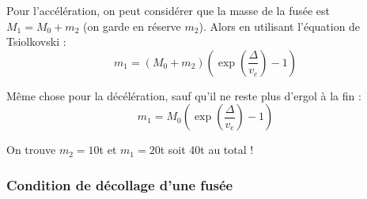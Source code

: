 \documentclass{report}
\begin{document}
\begin{itemize}
Pour l'accélération, on peut considérer que la masse de la fusée est $M_1=M_0+m_2$ (on garde en réserve $m_2$). Alors en utilisant l'équation de Tsiolkovski :
\begin{equation}
	m_1=(M_0+m_2)\left(\exp\left(\frac{\Delta}{v_e} \right) -1 \right) 
\end{equation}

Même chose pour la décélération, sauf qu'il ne reste plus d'ergol à la fin :
\begin{equation}
	m_1=M_0\left(\exp\left(\frac{\Delta}{v_e} \right) -1 \right) 
\end{equation}

On trouve $m_2=10$t et $m_1=20$t soit 40t au total !
\end{itemize}

\subsubsection*{Condition de décollage d'une fusée}
\end{document}

